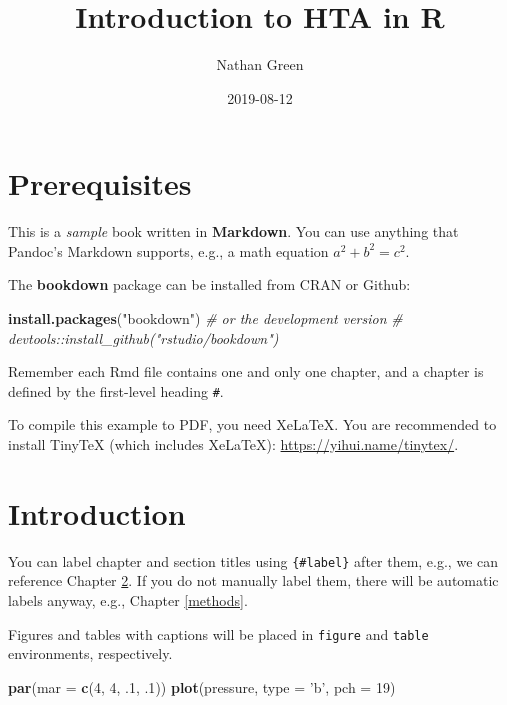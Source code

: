 \documentclass[]{book}
\title{Introduction to HTA in R}
\author{Nathan Green}
\date{2019-08-12}
\newenvironment{Shaded}{\begin{snugshade}}{\end{snugshade}}
\newcommand{\CommentTok}[1]{\textcolor[rgb]{0.56,0.35,0.01}{\textit{#1}}}
\newcommand{\DataTypeTok}[1]{\textcolor[rgb]{0.13,0.29,0.53}{#1}}
\newcommand{\DecValTok}[1]{\textcolor[rgb]{0.00,0.00,0.81}{#1}}
\newcommand{\FloatTok}[1]{\textcolor[rgb]{0.00,0.00,0.81}{#1}}
\newcommand{\KeywordTok}[1]{\textcolor[rgb]{0.13,0.29,0.53}{\textbf{#1}}}
\newcommand{\NormalTok}[1]{#1}
\newcommand{\StringTok}[1]{\textcolor[rgb]{0.31,0.60,0.02}{#1}}
\begin{document}
\maketitle

{
\setcounter{tocdepth}{1}
\tableofcontents
}
\hypertarget{prerequisites}{%
\chapter{Prerequisites}\label{prerequisites}}

This is a \emph{sample} book written in \textbf{Markdown}. You can use anything that Pandoc's Markdown supports, e.g., a math equation \(a^2 + b^2 = c^2\).

The \textbf{bookdown} package can be installed from CRAN or Github:

\begin{Shaded}
\begin{Highlighting}[]
\KeywordTok{install.packages}\NormalTok{(}\StringTok{"bookdown"}\NormalTok{)}
\CommentTok{# or the development version}
\CommentTok{# devtools::install_github("rstudio/bookdown")}
\end{Highlighting}
\end{Shaded}

Remember each Rmd file contains one and only one chapter, and a chapter is defined by the first-level heading \texttt{\#}.

To compile this example to PDF, you need XeLaTeX. You are recommended to install TinyTeX (which includes XeLaTeX): \url{https://yihui.name/tinytex/}.

\hypertarget{intro}{%
\chapter{Introduction}\label{intro}}

You can label chapter and section titles using \texttt{\{\#label\}} after them, e.g., we can reference Chapter \ref{intro}. If you do not manually label them, there will be automatic labels anyway, e.g., Chapter \ref{methods}.

Figures and tables with captions will be placed in \texttt{figure} and \texttt{table} environments, respectively.

\begin{Shaded}
\begin{Highlighting}[]
\KeywordTok{par}\NormalTok{(}\DataTypeTok{mar =} \KeywordTok{c}\NormalTok{(}\DecValTok{4}\NormalTok{, }\DecValTok{4}\NormalTok{, }\FloatTok{.1}\NormalTok{, }\FloatTok{.1}\NormalTok{))}
\KeywordTok{plot}\NormalTok{(pressure, }\DataTypeTok{type =} \StringTok{'b'}\NormalTok{, }\DataTypeTok{pch =} \DecValTok{19}\NormalTok{)}
\end{Highlighting}
\end{Shaded}
\end{document}
